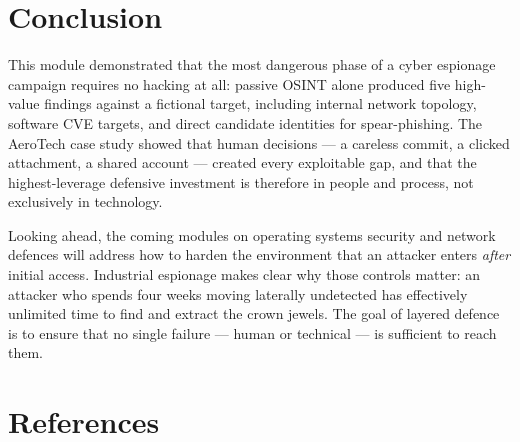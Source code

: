 \documentclass[11pt,a4paper]{article}
\begin{document}
\section*{Conclusion}

This module demonstrated that the most dangerous phase of a cyber espionage campaign
requires no hacking at all: passive OSINT alone produced five high-value findings against
a fictional target, including internal network topology, software CVE targets, and direct
candidate identities for spear-phishing.  The AeroTech case study showed that human
decisions --- a careless commit, a clicked attachment, a shared account --- created every
exploitable gap, and that the highest-leverage defensive investment is therefore in
people and process, not exclusively in technology.

Looking ahead, the coming modules on operating systems security and network defences will
address how to harden the environment that an attacker enters \textit{after} initial
access.  Industrial espionage makes clear why those controls matter: an attacker who spends
four weeks moving laterally undetected has effectively unlimited time to find and extract
the crown jewels.  The goal of layered defence is to ensure that no single failure ---
human or technical --- is sufficient to reach them.


\section*{References}
\end{document}
